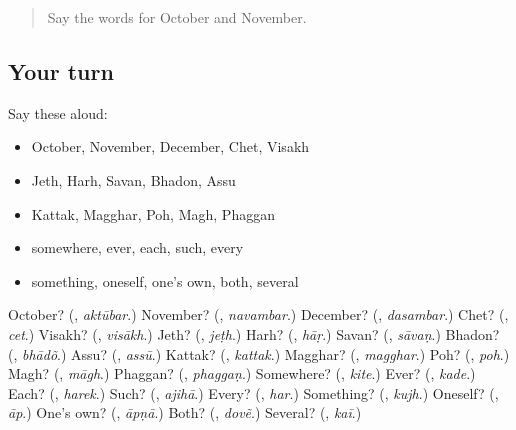 \begin{quote}
Say the words for October and November.
\end{quote}

\subsection*{Your turn}
Say these aloud:

\begin{itemize}
\raggedright
  \item October, November, December, Chet, Visakh
  \item Jeth, Harh, Savan, Bhadon, Assu
  \item Kattak, Magghar, Poh, Magh, Phaggan
  \item somewhere, ever, each, such, every
  \item something, oneself, one's own, both, several
\end{itemize}

\begin{tcolorbox}[breakable,colback=teal!4,colframe=teal!35!black,title={Before you move on}]
October? (\textbf{}, \emph{aktūbar}.) November? (\textbf{}, \emph{navambar}.) December? (\textbf{}, \emph{dasambar}.) Chet? (\textbf{}, \emph{cet}.) Visakh? (\textbf{}, \emph{visākh}.) Jeth? (\textbf{}, \emph{jeṭh}.) Harh? (\textbf{}, \emph{hāṛ}.) Savan? (\textbf{}, \emph{sāvaṇ}.) Bhadon? (\textbf{}, \emph{bhādõ}.) Assu? (\textbf{}, \emph{assū}.) Kattak? (\textbf{}, \emph{kattak}.) Magghar? (\textbf{}, \emph{magghar}.) Poh? (\textbf{}, \emph{poh}.) Magh? (\textbf{}, \emph{māgh}.) Phaggan? (\textbf{}, \emph{phaggaṇ}.) Somewhere? (\textbf{}, \emph{kite}.) Ever? (\textbf{}, \emph{kade}.) Each? (\textbf{}, \emph{harek}.) Such? (\textbf{}, \emph{ajihā}.) Every? (\textbf{}, \emph{har}.) Something? (\textbf{}, \emph{kujh}.) Oneself? (\textbf{}, \emph{āp}.) One's own? (\textbf{}, \emph{āpṇā}.) Both? (\textbf{}, \emph{dovẽ}.) Several? (\textbf{}, \emph{kaī}.)
\end{tcolorbox}
